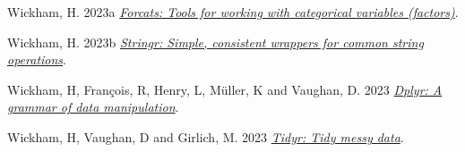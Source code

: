 \documentclass[
]{article}
\newlength{\cslhangindent}
\newlength{\cslentryspacingunit} %
\newenvironment{CSLReferences}[2] %
 {%
  \setlength{\parindent}{0pt}
  \ifodd #1
  \let\oldpar\par
  \def\par{\hangindent=\cslhangindent\oldpar}
  \fi
  \setlength{\parskip}{#2\cslentryspacingunit}
 }%
 {}
\begin{document}
\begin{CSLReferences}{1}{0}
\leavevmode{}%
Wickham, H. 2023a \emph{\href{https://forcats.tidyverse.org/}{Forcats: Tools for working with categorical variables (factors)}}.

\leavevmode{}%
Wickham, H. 2023b \emph{\href{https://stringr.tidyverse.org}{Stringr: Simple, consistent wrappers for common string operations}}.

\leavevmode{}%
Wickham, H, François, R, Henry, L, Müller, K and Vaughan, D. 2023 \emph{\href{https://dplyr.tidyverse.org}{Dplyr: A grammar of data manipulation}}.

\leavevmode{}%
Wickham, H, Vaughan, D and Girlich, M. 2023 \emph{\href{https://tidyr.tidyverse.org}{Tidyr: Tidy messy data}}.

\end{CSLReferences}
\end{document}
